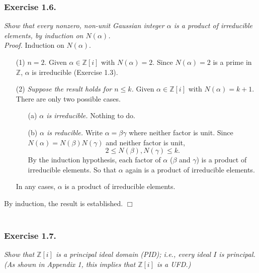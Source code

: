 \documentclass{article}
\begin{document}



\subsubsection*{Exercise 1.6.}
\emph{Show that every nonzero, non-unit Gaussian integer $\alpha$
is a product of irreducible elements, by induction on $N(\alpha)$.} \\

\emph{Proof.}
Induction on $N(\alpha)$.
\begin{enumerate}
\item[(1)]
\emph{$n = 2$}.
Given $\alpha \in \mathbb{Z}[i]$ with $N(\alpha) = 2$.
Since $N(\alpha) = 2$ is a prime in $\mathbb{Z}$,
$\alpha$ is irreducible (Exercise 1.3).
\item[(2)]
\emph{Suppose the result holds for $n \leq k$.}
Given $\alpha \in \mathbb{Z}[i]$ with $N(\alpha) = k+1$.
There are only two possible cases.
\begin{enumerate}
\item[(a)]
\emph{$\alpha$ is irreducible.}
Nothing to do.
\item[(b)]
\emph{$\alpha$ is reducible.}
Write $\alpha = \beta\gamma$ where neither factor is unit.
Since $N(\alpha) = N(\beta)N(\gamma)$ and neither factor is unit,
$$2 \leq N(\beta), N(\gamma) \leq k.$$
By the induction hypothesis, each factor of $\alpha$ ($\beta$ and $\gamma$)
is a product of irreducible elements.
So that $\alpha$ again is a product of irreducible elements.
\end{enumerate}
In any cases,
$\alpha$ is a product of irreducible elements.
\end{enumerate}
By induction, the result is established.
$\Box$ \\\\






\subsubsection*{Exercise 1.7.}
\emph{Show that $\mathbb{Z}[i]$ is a principal ideal domain (PID); i.e.,
every ideal $I$ is principal.
(As shown in Appendix 1, this implies that $\mathbb{Z}[i]$ is a UFD.)} \\
\end{document}
